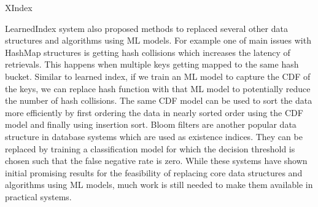 XIndex~\cite{xindex}

LearnedIndex system also proposed methods to replaced several other data structures and algorithms using ML models.
For example one of main issues with HashMap structures is getting hash collisions which increases the latency of retrievals.
This happens when multiple keys getting mapped to the same hash bucket.
Similar to learned index, if we train an ML model to capture the CDF of the keys, we can replace hash function with that ML model to potentially reduce the number of hash collisions.
The same CDF model can be used to sort the data more efficiently by first ordering the data in nearly sorted order using the CDF model and finally using insertion sort.
Bloom filters are another popular data structure in database systems which are used as existence indices.
They can be replaced by training a classification model for which the decision threshold is chosen such that the false negative rate is zero.
While these systems have shown initial promising results for the feasibility of replacing core data structures and algorithms using ML models, much work is still needed to make them available in practical systems.